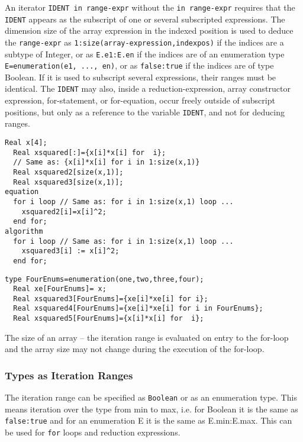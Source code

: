An iterator \lstinline!IDENT in range-expr! without the \lstinline!in range-expr! requires that
the \lstinline!IDENT! appears as the subscript of one or several subscripted
expressions. The dimension size of the array expression in the indexed
position is used to deduce the \lstinline!range-expr! as
\lstinline!1:size(array-expression,indexpos)! if the indices are a subtype of
Integer, or as \lstinline!E.e1:E.en! if the indices are of an enumeration type
\lstinline!E=enumeration(e1, ..., en)!, or as \lstinline!false:true! if the indices are of
type Boolean. If it is used to subscript several expressions, their
ranges must be identical. The \lstinline!IDENT! may also, inside a
reduction-expression, array constructor expression, for-statement, or
for-equation, occur freely outside of subscript positions, but only as a
reference to the variable \lstinline!IDENT!, and not for deducing ranges.

\begin{example}
\begin{lstlisting}[language=modelica]
  Real x[4];
  Real xsquared[:]={x[i]*x[i] for  i};
  // Same as: {x[i]*x[i] for i in 1:size(x,1)}
  Real xsquared2[size(x,1)];
  Real xsquared3[size(x,1)];
equation
  for i loop // Same as: for i in 1:size(x,1) loop ...
    xsquared2[i]=x[i]^2;
  end for;
algorithm
  for i loop // Same as: for i in 1:size(x,1) loop ...
    xsquared3[i] := x[i]^2;
  end for;
\end{lstlisting}

\begin{lstlisting}[language=modelica]
type FourEnums=enumeration(one,two,three,four);
  Real xe[FourEnums]= x;
  Real xsquared3[FourEnums]={xe[i]*xe[i] for i};
  Real xsquared4[FourEnums]={xe[i]*xe[i] for i in FourEnums};
  Real xsquared5[FourEnums]={x[i]*x[i] for  i};
\end{lstlisting}
\end{example}

The size of an array -- the iteration range is evaluated on entry to the
for-loop and the array size may not change during the execution of the
for-loop.

\subsubsection{Types as Iteration Ranges }

The iteration range can be specified as \lstinline!Boolean! or as an enumeration
type. This means iteration over the type from min to max, i.e. for
Boolean it is the same as \lstinline!false:true! and for an enumeration E it is the
same as E.min:E.max. This can be used for \lstinline!for! loops and reduction
expressions.

